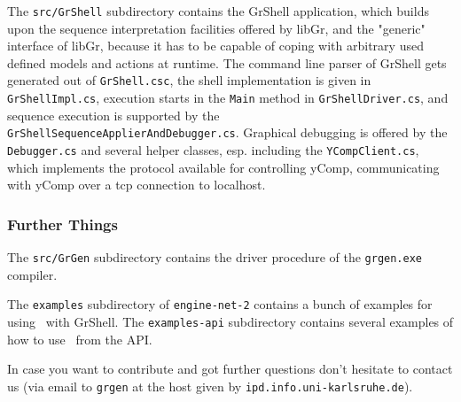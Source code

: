 The \texttt{src/GrShell} subdirectory contains the GrShell application, which builds upon the sequence interpretation facilities offered by libGr, and the "generic" interface of libGr, because it has to be capable of coping with arbitrary used defined models and actions at runtime.
The command line parser of GrShell gets generated out of \texttt{GrShell.csc}, the shell implementation is given in \texttt{GrShellImpl.cs}, execution starts in the \texttt{Main} method in \texttt{GrShell\-Driver.cs}, and sequence execution is supported by the \texttt{GrShell\-Sequence\-Applier\-And\-Debugger.cs}.
Graphical debugging is offered by the \texttt{Debugger.cs} and several helper classes, esp. including the \texttt{YCompClient.cs}, which implements the protocol available for controlling yComp, communicating with yComp over a tcp connection to localhost.

\subsubsection*{Further Things}

The \texttt{src/GrGen} subdirectory contains the driver procedure of the \texttt{grgen.exe} compiler.

The \texttt{examples} subdirectory of \texttt{engine-net-2} contains a bunch of examples for using \GrG~with GrShell.
The \texttt{examples-api} subdirectory contains several examples of how to use \GrG~from the API.

In case you want to contribute and got further questions don't hesitate to contact us 
(via email to \texttt{grgen} at the host given by \texttt{ipd.info.uni-karlsruhe.de}).



